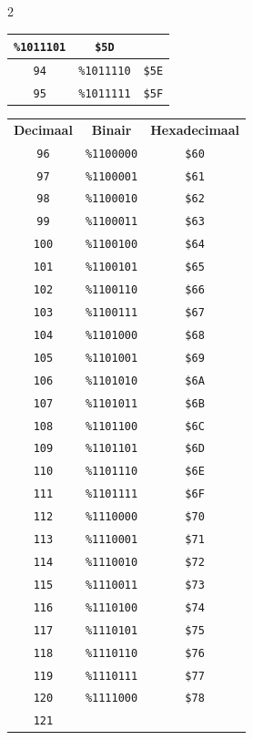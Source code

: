 \begin{multicols}{2}
\begin{center}
\begin{tabular}{|c|c|c|}
\texttt{\%1011101} &  \texttt{\$5D} \\ \hline \texttt{94} & \texttt{\%1011110} &  \texttt{\$5E} \\ \hline \texttt{95} & \texttt{\%1011111} &  \texttt{\$5F} \\ \hline
 \end{tabular}
\end{center}

\begin{center}
  \begin{tabular}{|c|c|c|}
  \hline
		\textbf{Decimaal} & \textbf{Binair} & \textbf{Hexadecimaal} \\ \hhline{|=|=|=|}    \texttt{96} & \texttt{\%1100000} &  \texttt{\$60} \\ \hline \texttt{97} & \texttt{\%1100001} &  \texttt{\$61} \\ \hline \texttt{98} & \texttt{\%1100010} &  \texttt{\$62} \\ \hline \texttt{99} & \texttt{\%1100011} &  \texttt{\$63} \\ \hline \texttt{100} & \texttt{\%1100100} &  \texttt{\$64} \\ \hline \texttt{101} & \texttt{\%1100101} &  \texttt{\$65} \\ \hline \texttt{102} & \texttt{\%1100110} &  \texttt{\$66} \\ \hline \texttt{103} & \texttt{\%1100111} &  \texttt{\$67} \\ \hline \texttt{104} & \texttt{\%1101000} &  \texttt{\$68} \\ \hline \texttt{105} & \texttt{\%1101001} &  \texttt{\$69} \\ \hline \texttt{106} & \texttt{\%1101010} &  \texttt{\$6A} \\ \hline \texttt{107} & \texttt{\%1101011} &  \texttt{\$6B} \\ \hline \texttt{108} & \texttt{\%1101100} &  \texttt{\$6C} \\ \hline \texttt{109} & \texttt{\%1101101} &  \texttt{\$6D} \\ \hline \texttt{110} & \texttt{\%1101110} &  \texttt{\$6E} \\ \hline \texttt{111} & \texttt{\%1101111} &  \texttt{\$6F} \\ \hline \texttt{112} & \texttt{\%1110000} &  \texttt{\$70} \\ \hline \texttt{113} & \texttt{\%1110001} &  \texttt{\$71} \\ \hline \texttt{114} & \texttt{\%1110010} &  \texttt{\$72} \\ \hline \texttt{115} & \texttt{\%1110011} &  \texttt{\$73} \\ \hline \texttt{116} & \texttt{\%1110100} &  \texttt{\$74} \\ \hline \texttt{117} & \texttt{\%1110101} &  \texttt{\$75} \\ \hline \texttt{118} & \texttt{\%1110110} &  \texttt{\$76} \\ \hline \texttt{119} & \texttt{\%1110111} &  \texttt{\$77} \\ \hline \texttt{120} & \texttt{\%1111000} &  \texttt{\$78} \\ \hline \texttt{121} & 
\end{tabular}
\end{center}
\end{multicols}
